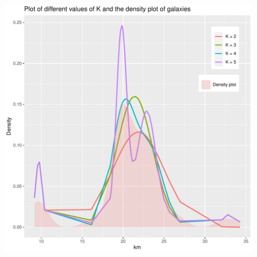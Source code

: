 \documentclass{article}\usepackage[]{graphicx}\usepackage[]{color}
\makeatletter
\def\maxwidth{ %
  \ifdim\Gin@nat@width>\linewidth
    \linewidth
  \else
    \Gin@nat@width
  \fi
}
\newenvironment{knitrout}{}{} %
\makeatother
\begin{document}
\begin{knitrout}
\includegraphics[width=\maxwidth]{figure/unnamed-chunk-7-2} 

\end{knitrout}
\end{document}
